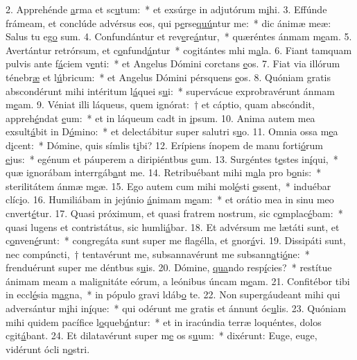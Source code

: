 2. Apprehénde \uline{a}rma et sc\uline{u}tum:~* et exsúrge in adjutórum m\uline{i}hi.
3. Effúnde frámeam, et conclúde advérsus eos, qui p\uline{e}rse\uline{quú}ntur me:~* dic ánimæ meæ: Salus tu eg\uline{o} sum.
4. Confundántur et rev\uline{e}re\uline{á}ntur,~* quæréntes ánmam m\uline{e}am.
5. Avertántur retrórsum, et c\uline{o}nfund\uline{á}ntur~* cogitántes mhi m\uline{a}la.
6. Fiant tamquam pulvis ante f\uline{á}ciem v\uline{e}nti:~* et Angelus Dómini corctans \uline{e}os.
7. Fiat via illórum ténebr\uline{æ} et l\uline{ú}bricum:~* et Angelus Dómini pérsquens \uline{e}os.
8. Quóniam gratis abscondérunt mihi intéritum l\uline{á}quei s\uline{u}i:~* supervácue exprobravérunt ánmam m\uline{e}am.
9. Véniat illi láqueus, quem ignórat:~† et cáptio, quam abscóndit, appreh\uline{é}ndat \uline{e}um:~* et in láqueum cadt in \uline{i}psum.
10. Anima autem mea exsult\uline{á}bit in D\uline{ó}mino:~* et delectábitur super salutri s\uline{u}o.
11. Omnia ossa m\uline{e}a d\uline{i}cent:~* Dómine, quis símlis t\uline{i}bi?
12. Erípiens ínopem de manu forti\uline{ó}rum \uline{e}jus:~* egénum et páuperem a diripiéntbus \uline{e}um.
13. Surgéntes t\uline{e}stes in\uline{í}qui,~* quæ ignorábam interrgáb\uline{a}nt me.
14. Retribuébant mihi m\uline{a}la pro b\uline{o}nis:~* sterilitátem ánmæ m\uline{e}æ.
15. Ego autem cum mihi mol\uline{é}sti \uline{e}ssent,~* induébar clíc\uline{i}o.
16. Humiliábam in jejúnio \uline{á}nimam m\uline{e}am:~* et orátio mea in sinu meo cnvert\uline{é}tur.
17. Quasi próximum, et quasi fratrem nostrum, sic c\uline{o}mplac\uline{é}bam:~* quasi lugens et contristátus, sic humli\uline{á}bar.
18. Et advérsum me lætáti sunt, et c\uline{o}nven\uline{é}runt:~* congregáta sunt super me flagélla, et gnor\uline{á}vi.
19. Dissipáti sunt, nec compúncti,~† tentavérunt me, subsannavérunt me subsann\uline{a}ti\uline{ó}ne:~* frenduérunt super me déntbus s\uline{u}is.
20. Dómine, \uline{qua}ndo resp\uline{í}cies?~* restítue ánimam meam a malignitáte eórum, a leónibus úncam m\uline{e}am.
21. Confitébor tibi in eccl\uline{é}sia m\uline{a}gna,~* in pópulo gravi ldáb\uline{o} te.
22. Non supergáudeant mihi qui adversántur m\uline{i}hi in\uline{í}que:~* qui odérunt me gratis et ánnunt óc\uline{u}lis.
23. Quóniam mihi quidem pacífice l\uline{o}queb\uline{á}ntur:~* et in iracúndia terræ loquéntes, dolos cgit\uline{á}bant.
24. Et dilatavérunt super m\uline{e} os s\uline{u}um:~* dixérunt: Euge, euge, vidérunt ócli n\uline{o}stri.
